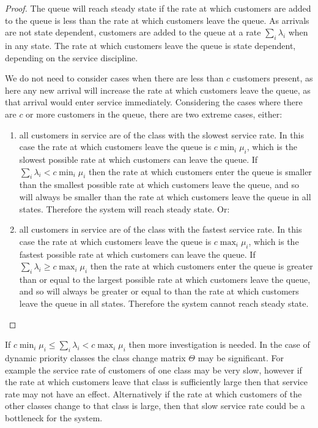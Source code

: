\documentclass{article}
\begin{document}
\begin{proof}
The queue will reach steady state if the rate at which customers are added to
the queue is less than the rate at which customers leave the queue.
As arrivals are not state dependent, customers are added to the queue at a rate
$\sum_i \lambda_i$ when in any state.
The rate at which customers leave the queue is state dependent, depending on the
service discipline.

We do not need to consider cases when there are less than $c$ customers present,
as here any new arrival will increase the rate at which customers leave the
queue, as that arrival would enter service immediately.
Considering the cases where there are $c$ or more customers in the queue, there
are two extreme cases, either:

\begin{enumerate}
  \item all customers in service are of the class with the slowest service rate.
  In this case the rate at which customers leave the queue is $c \min_i \mu_i$,
  which is the slowest possible rate at which customers can leave the queue.
  If $\sum_i \lambda_i < c \min_i \mu_i$ then the rate at which customers enter
  the queue is smaller than the smallest possible rate at which customers leave
  the queue, and so will always be smaller than the rate at which customers
  leave the queue in all states. Therefore the system will reach steady state.
  Or:
  \item all customers in service are of the class with the fastest service rate.
  In this case the rate at which customers leave the queue is $c \max_i \mu_i$,
  which is the fastest possible rate at which customers can leave the queue.
  If $\sum_i \lambda_i \geq c \max_i \mu_i$ then the rate at which customers
  enter the queue is greater than or equal to the largest possible rate at which
  customers leave the queue, and so will always be greater or equal to than the
  rate at which customers leave the queue in all states. Therefore the system
  cannot reach steady state.
\end{enumerate}
\end{proof}

If $c \min_i \mu_i \leq \sum_i \lambda_i < c \max_i \mu_i$ then more
investigation is needed. In the case of dynamic priority classes the class
change matrix $\Theta$ may be significant. For example the service rate of
customers of one class may be very slow, however if the rate at which customers
leave that class is sufficiently large then that service rate may not have an
effect. Alternatively if the rate at which customers of the other classes change
to that class is large, then that slow service rate could be a bottleneck for
the system.
\end{document}
